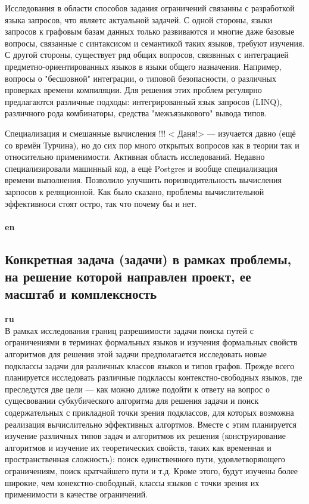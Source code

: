 \documentclass[12pt]{article}  %
\theoremstyle{remark}
\begin{document}
Исследования в области способов задания ограничений связанны с разработкой языка запросов, что являетс актуальной задачей. С одной стороны, языки запросов к графовым базам данных только развиваются и многие даже базовые вопросы, связанные с синтаксисом и семантикой таких языков, требуют изучения. С другой стороны, существует ряд общих вопросов, связвнных с интеграцией предметно-ориентированных языков в языки общего назначения. Например, вопросы о "бесшовной" интеграции, о типовой безопасности, о различных проверках времени компиляции. Для решения этих проблем регулярно предлагаются различные подходы: интегрированный язык запросов (LINQ), различного рода комбинаторы, средства "межъязыкового" вывода типов.

Специализация и смешанные вычисления !!! {\huge< Даня!>}  --- изучается давно (ещё со времён Турчина), но до сих пор много открытых вопросов как в теории так и относительно применимости. Активная область исследований. Недавно специализировали машинный код, а ещё Postgres и вообще специализация времени выполнения. Позволило улучшить поризводительность вычисления зарпосов к реляционной. Как было сказано, проблемы вычислительной эффективноси стоят остро, так что почему бы и нет.
\\
\\
\textbf{en}\\


\subsection{Конкретная задача (задачи) в рамках проблемы, на решение которой направлен проект, ее масштаб и комплексность}

\textbf{ru}\\
%
В рамках исследования границ разрешимости задачи поиска путей с ограничениями в терминах формальных языков и изучения формальных свойств алгоритмов для решения этой задачи предполагается исследовать новые подклассы задачи для различных классов языков и типов графов. Прежде всего планируется исследовать различные подклассы контекстно-свободных языков, где преследутся две цели --- как можно длиже подойти к ответу на вопрос о сущесвовании субкубического алгоритма для решения задачи и поиск содержательных с прикладной точки зрения подклассов, для которых возможна реализация вычислительно эффективных алгортмов. Вместе с этим планируется изучение различных типов задач и алгоритмов их решения (конструирование алгоритмов и изучение их теоретических свойств, таких как временная и пространственная сложность): поиск единственного пути, удовлетворяющего ограничениям, поиск кратчайшего пути и т.д. Кроме этого, будут изучены более широкие, чем конекстно-свободный, классы языков с точки зрения их применимости в качестве ограничений.
\end{document}
